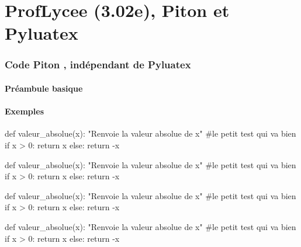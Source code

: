 \documentclass[french,a4paper,10pt]{article}
\def\PLver{3.02e}
\begin{document}
\part*{ProfLycee (\PLver), Piton et Pyluatex}

\section{Code \og Piton \fg{}, indépendant de Pyluatex}

\subsection{Préambule basique}

{\small {}}

\subsection{Exemples}

{\small \begin{codehigh}
\begin{CodePiton}{}
def valeur_absolue(x):
    "Renvoie la valeur absolue de x"
    #le petit test qui va bien
    if x > 0:
        return x
    else:
    return -x
\end{CodePiton}
\end{codehigh}}

\begin{CodePiton}{}
def valeur_absolue(x):
	"Renvoie la valeur absolue de x"
	#le petit test qui va bien
	if x > 0:
		return x
	else:
		return -x
\end{CodePiton}

{\small \begin{codehigh}
\begin{CodePiton}[Largeur=10cm]{}
def valeur_absolue(x):
    "Renvoie la valeur absolue de x"
    #le petit test qui va bien
    if x > 0:
        return x
    else:
    return -x
\end{CodePiton}
\end{codehigh}}

\begin{CodePiton}[Largeur=10cm]{}
def valeur_absolue(x):
	"Renvoie la valeur absolue de x"
	#le petit test qui va bien
	if x > 0:
		return x
	else:
		return -x
\end{CodePiton}
\end{document}
